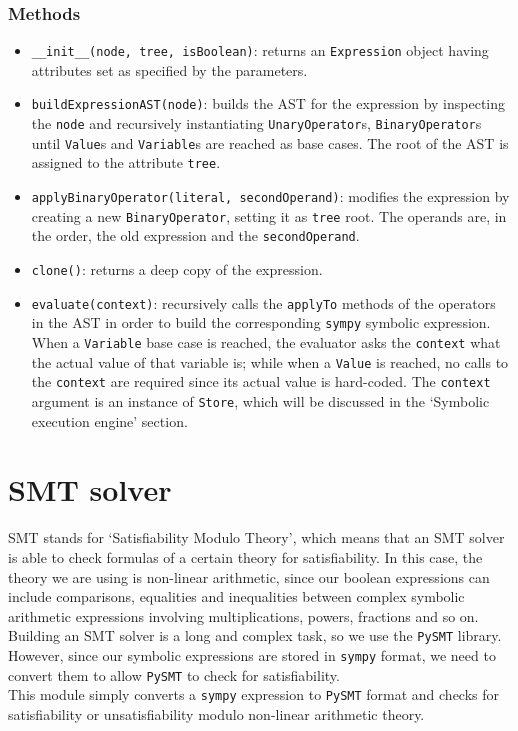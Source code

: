 \documentclass[12pt,a4paper]{report}
\theoremstyle{definition}
\theoremstyle{definition}
\theoremstyle{definition}
\begin{document}
\subsubsection{Methods}
\begin{itemize}
    \itemsep 0em
    \item \texttt{\_\_init\_\_(node, tree, isBoolean)}: returns an \texttt{Expression} object having attributes set as specified by the parameters.
    \item \texttt{buildExpressionAST(node)}: builds the AST for the expression by inspecting the \texttt{node} and recursively instantiating \texttt{UnaryOperator}s, \texttt{BinaryOperator}s until \texttt{Value}s and \texttt{Variable}s are reached as base cases. The root of the AST is assigned to the attribute \texttt{tree}.
    \item \texttt{applyBinaryOperator(literal, secondOperand)}: modifies the expression by creating a new \texttt{BinaryOperator}, setting it as \texttt{tree} root. The operands are, in the order, the old expression and the \texttt{secondOperand}.
    \item \texttt{clone()}: returns a deep copy of the expression.
    \item \texttt{evaluate(context)}: recursively calls the \texttt{applyTo} methods of the operators in the AST in order to build the corresponding \texttt{sympy} symbolic expression. When a \texttt{Variable} base case is reached, the evaluator asks the \texttt{context} what the actual value of that variable is; while when a \texttt{Value} is reached, no calls to the \texttt{context} are required since its actual value is hard-coded. The \texttt{context} argument is an instance of \texttt{Store}, which will be discussed in the `Symbolic execution engine' section.
\end{itemize}


\section{SMT solver}
SMT stands for `Satisfiability Modulo Theory', which means that an SMT solver is able to check formulas of a certain theory for satisfiability. In this case, the theory we are using is non-linear arithmetic, since our boolean expressions can include comparisons, equalities and inequalities between complex symbolic arithmetic expressions involving multiplications, powers, fractions and so on.\\
Building an SMT solver is a long and complex task, so we use the \texttt{PySMT} library. However, since our symbolic expressions are stored in \texttt{sympy} format, we need to convert them to allow \texttt{PySMT} to check for satisfiability.\\
This module simply converts a \texttt{sympy} expression to \texttt{PySMT} format and checks for satisfiability or unsatisfiability modulo non-linear arithmetic theory.
\end{document}

